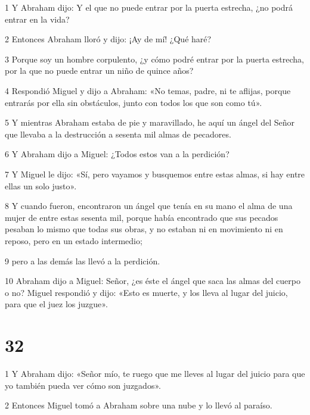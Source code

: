 \par 1 Y Abraham dijo: Y el que no puede entrar por la puerta estrecha, ¿no podrá entrar en la vida?

\par 2 Entonces Abraham lloró y dijo: ¡Ay de mí! ¿Qué haré?

\par 3 Porque soy un hombre corpulento, ¿y cómo podré entrar por la puerta estrecha, por la que no puede entrar un niño de quince años?

\par 4 Respondió Miguel y dijo a Abraham: «No temas, padre, ni te aflijas, porque entrarás por ella sin obstáculos, junto con todos los que son como tú».

\par 5 Y mientras Abraham estaba de pie y maravillado, he aquí un ángel del Señor que llevaba a la destrucción a sesenta mil almas de pecadores.

\par 6 Y Abraham dijo a Miguel: ¿Todos estos van a la perdición?

\par 7 Y Miguel le dijo: «Sí, pero vayamos y busquemos entre estas almas, si hay entre ellas un solo justo».

\par 8 Y cuando fueron, encontraron un ángel que tenía en su mano el alma de una mujer de entre estas sesenta mil, porque había encontrado que sus pecados pesaban lo mismo que todas sus obras, y no estaban ni en movimiento ni en reposo, pero en un estado intermedio;

\par 9 pero a las demás las llevó a la perdición.

\par 10 Abraham dijo a Miguel: Señor, ¿es éste el ángel que saca las almas del cuerpo o no? Miguel respondió y dijo: «Esto es muerte, y los lleva al lugar del juicio, para que el juez los juzgue».

\chapter{32}

\par 1 Y Abraham dijo: «Señor mío, te ruego que me lleves al lugar del juicio para que yo también pueda ver cómo son juzgados».

\par 2 Entonces Miguel tomó a Abraham sobre una nube y lo llevó al paraíso.

